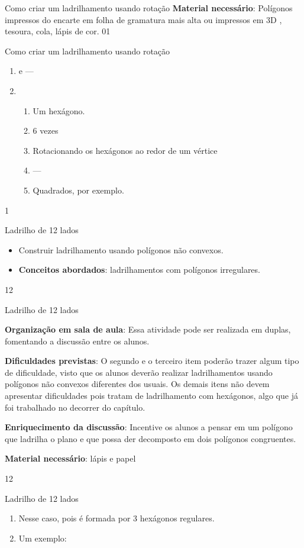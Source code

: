 {\begin{sugestions}{Como criar um ladrilhamento usando rotação}
{	\textbf{Material necessário}: Polígonos impressos do encarte em folha de gramatura mais alta ou impressos em 3D , tesoura, cola, lápis de cor.
}{0}{1}
\end{sugestions}
\begin{answer}{Como criar um ladrilhamento usando rotação}
{
	\begin{enumerate}
	\item {} e  ---
	\setcounter{enumi}{3}
	\item 
	\begin{enumerate}
	\item Um hexágono.
	\item 6 vezes
	\item Rotacionando os hexágonos ao redor de um vértice
	\item ---
	\item Quadrados, por exemplo.
	\end{enumerate}
	\end{enumerate}
}{1}
\end{answer}
\begin{objectives}{Ladrilho de 12 lados}
{
	\begin{itemize}
	\item Construir ladrilhamento usando polígonos não convexos.
	\item \textbf{Conceitos abordados}: ladrilhamentos com polígonos irregulares.
	\end{itemize}
}{1}{2}
\end{objectives}
\begin{sugestions}{Ladrilho de 12 lados}
{
	\textbf{Organização em sala de aula}: Essa atividade pode ser realizada em duplas, fomentando a discussão entre os alunos. 

	\textbf{Dificuldades previstas}: O segundo e o terceiro item poderão trazer algum tipo de dificuldade, visto que os alunos deverão realizar ladrilhamentos usando polígonos não convexos diferentes dos usuais. Os demais itens não devem apresentar dificuldades pois tratam de ladrilhamento com hexágonos, algo que já foi trabalhado no decorrer do capítulo.

	\textbf{Enriquecimento da discussão}: Incentive os alunos a pensar em um polígono que ladrilha o plano e que possa der decomposto em dois polígonos congruentes. 

	\textbf{Material necessário}: lápis e papel
}{1}{2}
\end{sugestions}
\begin{answer}{Ladrilho de 12 lados}
{
	\begin{enumerate}
	\item Nesse caso, pois é formada por 3 hexágonos regulares.
	\item Um exemplo:
	\begin{figure}[H]
	\centering
	

\end{figure}
\end{enumerate}}
\end{answer}}
